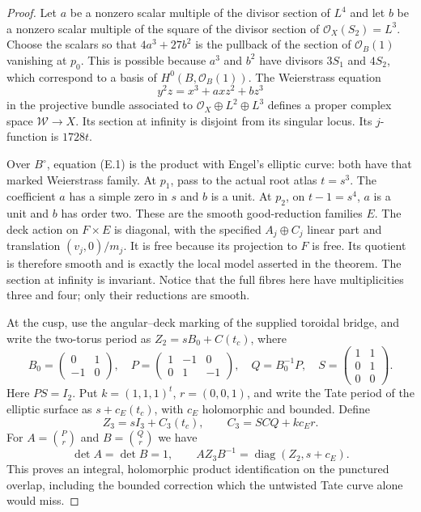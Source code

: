 \begin{proof}
Let $a$ be a nonzero scalar multiple of the divisor section of $L^4$
and let $b$ be a nonzero scalar multiple of the square of the divisor
section of $\mathcal O_X(S_2)=L^3$.  Choose the scalars so that
$4a^3+27b^2$ is the pullback of the section of $\mathcal O_B(1)$
vanishing at $p_0$.  This is possible because $a^3$ and $b^2$ have
divisors $3S_1$ and $4S_2$, which correspond to a basis of
$H^0(B,\mathcal O_B(1))$.  The Weierstrass equation
\[
 y^2z=x^3+axz^2+bz^3
 \tag{E.1}
\]
in the projective bundle associated to
$\mathcal O_X\oplus L^2\oplus L^3$ defines a proper complex space
$\mathscr W\to X$.  Its section at infinity is disjoint from its
singular locus.  Its $j$-function is $1728t$.

Over $B^\circ$, equation (E.1) is the product with Engel's elliptic
curve: both have that marked Weierstrass family.  At $p_1$, pass to the
actual root atlas $t=s^3$.  The coefficient $a$ has a simple zero in $s$
and $b$ is a unit.  At $p_2$, on $t-1=s^4$, $a$ is a unit and $b$ has
order two.  These are the smooth good-reduction families $E$.
The deck action on $F\times E$ is diagonal, with the specified
$A_j\oplus C_j$ linear part and translation $(v_j,0)/m_j$.
It is free because its projection to $F$ is free.  Its quotient is
therefore smooth and is exactly the local model asserted in the theorem.
The section at infinity is invariant.  Notice that the full fibres here
have multiplicities three and four; only their reductions are smooth.

At the cusp, use the angular--deck marking of the supplied toroidal
bridge, and write the two-torus period as
$Z_2=sB_0+C(t_c)$, where
\[
 B_0=\begin{pmatrix}0&1\\-1&0\end{pmatrix},\quad
 P=\begin{pmatrix}1&-1&0\\0&1&-1\end{pmatrix},\quad
 Q=B_0^{-1}P,\quad
 S=\begin{pmatrix}1&1\\0&1\\0&0\end{pmatrix}.
\]
Here $PS=I_2$.  Put $k=(1,1,1)^t$, $r=(0,0,1)$, and write the Tate
period of the elliptic surface as $s+c_E(t_c)$, with $c_E$ holomorphic
and bounded.  Define
\[
 Z_3=sI_3+C_3(t_c),\qquad
 C_3=SCQ+kc_Er.
 \tag{E.2}
\]
For $A=\binom{P}{r}$ and $B=\binom{Q}{r}$ we have
\[
 \det A=\det B=1,\qquad
 AZ_3B^{-1}=\operatorname{diag}(Z_2,s+c_E).
 \tag{E.3}
\]
This proves an integral, holomorphic product identification on the
punctured overlap, including the bounded correction which the untwisted
Tate curve alone would miss.


\end{proof}
